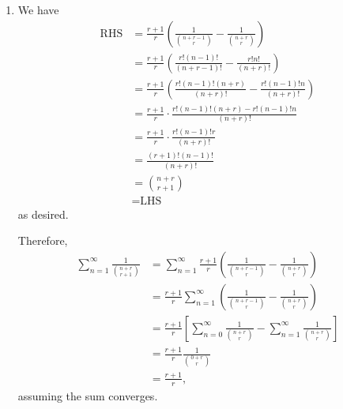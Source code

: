 \Question{\currfilebase}

\begin{enumerate}
    \item We have
          \begin{align*}
              \text{RHS} & = \frac{r+1}{r} \left(\frac{1}{\binom{n+r-1}{r}} - \frac{1}{\binom{n+r}{r}}\right)       \\
                         & = \frac{r+1}{r} \left(\frac{r! (n-1)!}{(n+r-1)!} - \frac{r! n!}{(n+r)!}\right)           \\
                         & = \frac{r+1}{r} \left(\frac{r! (n-1)! (n+r)}{(n+r)!} - \frac{r! (n-1)! n}{(n+r)!}\right) \\
                         & = \frac{r+1}{r} \cdot \frac{r! (n-1)! (n+r) - r! (n-1)! n}{(n+r)!}                       \\
                         & = \frac{r+1}{r} \cdot \frac{r! (n-1)! r}{(n+r)!}                                         \\
                         & = \frac{(r+1)! (n-1)! }{(n+r)!}                                                          \\
                         & = \binom{n+r}{r+1}                                                                       \\
                         & = \text{LHS}
          \end{align*}
          as desired.

          Therefore,
          \begin{align*}
              \sum_{n = 1}^{\infty} \frac{1}{\binom{n+r}{r+1}} & = \sum_{n = 1}^{\infty} \frac{r+1}{r} \left(\frac{1}{\binom{n+r-1}{r}} - \frac{1}{\binom{n+r}{r}}\right)                         \\
                                                               & = \frac{r+1}{r} \sum_{n = 1}^{\infty} \left(\frac{1}{\binom{n+r-1}{r}} - \frac{1}{\binom{n+r}{r}}\right)                         \\
                                                               & = \frac{r+1}{r} \left[\sum_{n = 0}^{\infty} \frac{1}{\binom{n + r}{r}} - \sum_{n = 1}^{\infty} \frac{1}{\binom{n + r}{r}}\right] \\
                                                               & = \frac{r+1}{r} \frac{1}{\binom{0+r}{r}}                                                                                         \\
                                                               & = \frac{r+1}{r},
          \end{align*}
          assuming the sum converges.


\end{enumerate}
